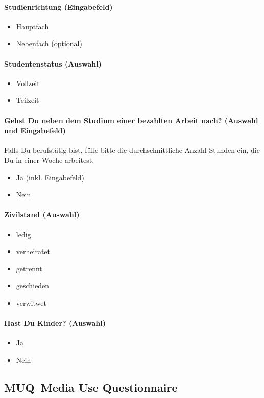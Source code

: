 \paragraph{Studienrichtung (Eingabefeld)}
    \begin{itemize}
      \item Hauptfach
      \item Nebenfach (optional)
    \end{itemize}
\paragraph{Studentenstatus (Auswahl)}
    \begin{itemize}
      \item Vollzeit
      \item Teilzeit
    \end{itemize}
\paragraph{Gehst Du neben dem Studium einer bezahlten Arbeit nach? (Auswahl und Eingabefeld)}
Falls Du berufstätig bist, fülle bitte die durchschnittliche Anzahl Stunden ein, die Du in einer Woche arbeitest.
    \begin{itemize}
      \item Ja (inkl. Eingabefeld)
      \item Nein
    \end{itemize}
\paragraph{Zivilstand (Auswahl)}
    \begin{itemize}
      \item ledig
      \item verheiratet
      \item getrennt
      \item geschieden
      \item verwitwet
    \end{itemize}
\paragraph{Hast Du Kinder? (Auswahl)} 
    \begin{itemize}
      \item Ja
      \item Nein
    \end{itemize}    
\subsection{MUQ--Media Use Questionnaire}\label{anhangSection.muq}   
